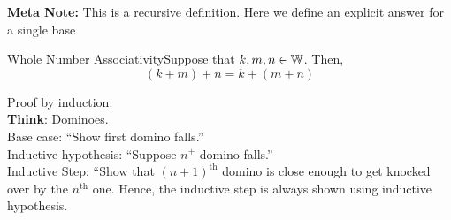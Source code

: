         \textbf{Meta Note:} This is a recursive definition. Here we define an explicit answer for a single base 


            \begin{ntheorem}
                {Whole Number Associativity}Suppose that \(k,m,n\in \mathbb{W}\). Then, \[(k+m) + n = k + (m + n)\]
            \end{ntheorem}
            
            Proof by induction. \\
            \textbf{Think}: Dominoes. \\
            Base case: ``Show first domino falls.'' \\
            Inductive hypothesis: ``Suppose \(n^+\) domino falls.'' \\
            Inductive Step: ``Show that \((n+1)^{\text{th}}\) domino is close enough to get knocked over by the \(n^{\text{th}}\) one. Hence, the inductive step is always shown using inductive hypothesis.
            
